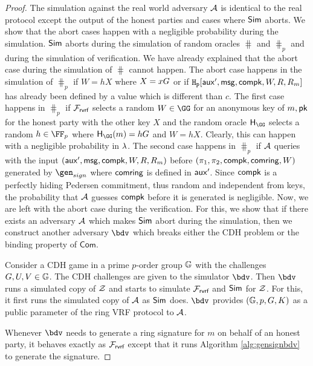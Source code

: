 \begin{proof}
	The  simulation against the real world adversary $ \mathcal{A} $ is identical to the real protocol except the output of the honest parties and cases where $ \mathsf{Sim} $ aborts. 
	We show that the abort cases happen with a negligible probability during the simulation. $ \mathsf{Sim} $ aborts during the simulation of random oracles $ \hash $ and $ \hash_p $ and during the simulation of verification. We have already explained that the abort case during the simulation of $ \hash $ cannot happen. The abort case happens in the simulation of $ \hash_p $ if $ W = hX $ where $ X = xG $ or if $ \mathtt{H_p}[\mathsf{aux}', \mathsf{msg},\mathsf{compk},W,R,R_m] $ has already been defined by a value which is different than $ c $. The first case happens in $ \hash_p $ if $ \mathcal{F}_{\textsf{rvrf}} $ selects a random $ W \in \GG$ for an anonymous key of $ m, \mathsf{pk}  $ for the honest party with the other key $ X  $ and the random oracle $ \hashG $ selects a random $ h \in \FF_p  $ where $ \hashG(m) = hG $ and $ W = hX $. Clearly, this can happen with a negligible probability in $ \lambda $. The 
	second case happens in $ \hash_p $ if $ \mathcal{A} $ queries with the input $ (\mathsf{aux}', \mathsf{msg},\mathsf{compk},W,R,R_m) $ before $ (\pi_1,\pi_2,\mathsf{compk},\mathsf{comring},W) $ generated by $ \gen_{sign} $ where $ \mathsf{comring} $ is defined in $ \mathsf{aux}' $. Since $ \mathsf{compk} $ is a perfectly hiding Pedersen commitment, thus random and independent from keys, the probability that $ \mathcal{A} $ guesses $ \mathsf{compk} $ before it is generated is negligible.
	Now, we are left with the abort case during the verification.
	For this, we show that if there exists an adversary $ \mathcal{A} $ which makes $ \mathsf{Sim} $ abort during the simulation, then we construct another adversary $ \bdv $ which breaks either the CDH problem or the binding property of $ \mathsf{Com}$.
	
	Consider a CDH game in a prime $ p $-order group  $ {\mathbb{G}} $ with the challenges $ G,U, V \in {\mathbb{G}}$. The CDH challenges are given to the simulator $ \bdv $. Then $ \bdv $ runs a simulated copy of $ \mathcal{Z} $ and starts to simulate $ \mathcal{F}_{\textsf{rvrf}} $ and $ \mathsf{Sim} $ for $ \mathcal{Z} $. For this, it first runs the simulated copy of $ \mathcal{A} $ as $ \mathsf{Sim} $ does. $ \bdv $ provides $ ({\mathbb{G}}, p, G , K) $ as a public parameter of the ring VRF protocol to $ \mathcal{A} $.
	
	Whenever $ \bdv $ needs to generate a ring signature for $ m $ on behalf of an honest party, it behaves exactly as $ \mathcal{F}_{\textsf{rvrf}} $ except that it runs   Algorithm \ref{alg:gensignbdv} to generate the signature. 
	

\end{proof}
